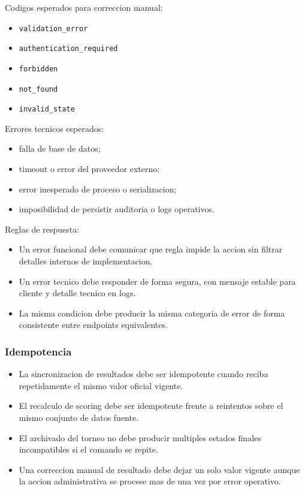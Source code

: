Codigos esperados para correccion manual:
\begin{itemize}
  \item \texttt{validation\_error}
  \item \texttt{authentication\_required}
  \item \texttt{forbidden}
  \item \texttt{not\_found}
  \item \texttt{invalid\_state}
\end{itemize}

Errores tecnicos esperados:

\begin{itemize}
  \item falla de base de datos;
  \item timeout o error del proveedor externo;
  \item error inesperado de proceso o serializacion;
  \item imposibilidad de persistir auditoria o logs operativos.
\end{itemize}

Reglas de respuesta:

\begin{itemize}
  \item Un error funcional debe comunicar que regla impide la accion sin filtrar detalles internos de implementacion.
  \item Un error tecnico debe responder de forma segura, con mensaje estable para cliente y detalle tecnico en logs.
  \item La misma condicion debe producir la misma categoria de error de forma consistente entre endpoints equivalentes.
\end{itemize}

\subsubsection{Idempotencia}

\begin{itemize}
  \item La sincronizacion de resultados debe ser idempotente cuando reciba repetidamente el mismo valor oficial vigente.
  \item El recalculo de scoring debe ser idempotente frente a reintentos sobre el mismo conjunto de datos fuente.
  \item El archivado del torneo no debe producir multiples estados finales incompatibles si el comando se repite.
  \item Una correccion manual de resultado debe dejar un solo valor vigente aunque la accion administrativa se procese mas de una vez por error operativo.
\end{itemize}

